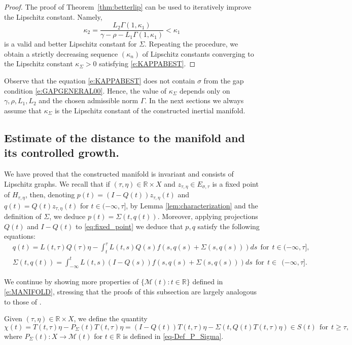 \documentclass[a4paper,11pt,reqno]{amsart}
\theoremstyle{plain}
\theoremstyle{definition}
\numberwithin{equation}{section}
\newcommand{\R}{\mathbb{R}}
\newcommand{\calm}{\mathcal M}
\renewcommand{\geq}{\geqslant}
\begin{document}
\begin{proof}
The proof of Theorem~\ref{thm:betterlip} can be used to iteratively improve the Lipschitz constant. Namely, 
$$\kappa_2=\frac{L_2\Gamma(1,\kappa_1)}{\gamma-\rho-L_1\Gamma(1,\kappa_1)} < \kappa_1$$
is a valid and better Lipschitz constant for $\Sigma$. Repeating the procedure, we obtain a strictly decreasing sequence $(\kappa_n)$ of 
Lipschitz constants converging to the Lipschitz constant $\kappa_\Sigma>0$ satisfying \eqref{e:KAPPABEST}. 
\end{proof}

Observe that the equation \eqref{e:KAPPABEST} does not contain $\sigma$ from the gap condition \eqref{e:GAPGENERAL00}. Hence, the value of $\kappa_\Sigma$ depends only on $\gamma, \rho, L_1, L_2$ and the chosen admissible norm $\Gamma$.     
In the next sections we always assume that $\kappa_\Sigma$ is the Lipschitz constant of the constructed inertial manifold.	

\subsection{Estimate of the distance to the manifold and its controlled growth.} We have proved that the constructed manifold is invariant and consists of Lipschitz graphs. We recall that if $(\tau,\eta) \in \R\times X$ and $z_{\tau,\eta} \in E_{\sigma,\tau}$ is a fixed point of $H_{\tau,\eta}$, then, denoting $p(t) = (I-Q(t))z_{\tau,\eta}(t)$ and $q(t)=Q(t)z_{\tau,\eta}(t)$ for $t\in (-\infty,\tau]$, by Lemma \ref{lem:characterization} and the definition of $\Sigma$, we deduce $p(t) = \Sigma(t,q(t))$. Moreover, applying projections $Q(t)$ and $I-Q(t)$ to \eqref{eq:fixed_point} we deduce that $p, q$ satisfy the following equations:
\begin{align}\label{e:QWITHSIGMA}
&	q(t)=L(t,\tau)Q(\tau)\eta-\int_{t}^{\tau}L(t,s)Q(s)f(s,q(s)+\Sigma(s,q(s)))ds\ \ \text{for}\ \  t\in (-\infty,\tau],\\
& \label{e:PWITHSIGMA}
	\Sigma(t,q(t))=\int_{-\infty}^{t}L(t,s)(I-Q(s))f(s,q(s)+\Sigma(s,q(s)))ds\ \  \text{for}\ \ t\in\ \  (-\infty,\tau].
\end{align}

We continue by showing more properties of $\{ \calm(t)\colon t\in \R\}$ defined in \eqref{e:MANIFOLD}, stressing that the proofs of this subsection are largely analogous to those of \cite{CLMO-S25}. 

Given $(\tau,\eta)\in\R\times X$, we define the quantity
$$\chi(t)=T(t,\tau)\eta-P_\Sigma(t)T(t,\tau)\eta=(I-Q(t))T(t,\tau)\eta-\Sigma(t,Q(t)T(t,\tau)\eta)\in S(t)\ \ \text{for}\ \  t\geq\tau,$$
where $P_\Sigma(t)\colon X\to\calm(t)$ for $t\in\R$ is defined in \eqref{eq-Def_P_Sigma}.
\end{document}
